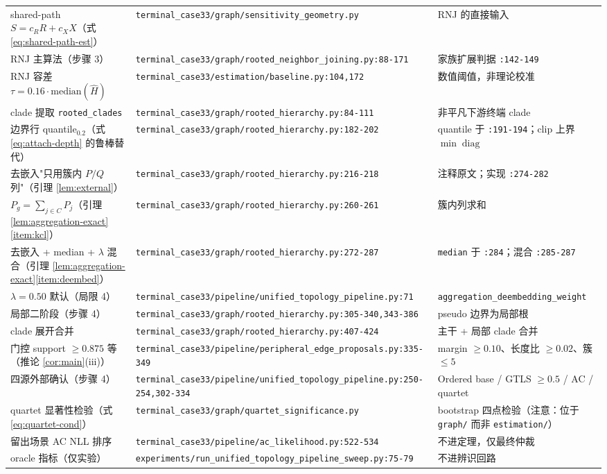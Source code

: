 \documentclass[UTF8,11pt]{ctexart}
\begin{document}
\begin{center}
\begin{tabular}{p{4.6cm}p{6.2cm}p{4.2cm}}
shared-path $S=c_RR+c_XX$（式 \eqref{eq:shared-path-est}）
  & \texttt{terminal\_case33/graph/sensitivity\_geometry.py}
  & RNJ 的直接输入 \\
RNJ 主算法（步骤 3）
  & \texttt{terminal\_case33/graph/rooted\_neighbor\_joining.py:88-171}
  & 家族扩展判据 \texttt{:142-149} \\
RNJ 容差 $\tau=0.16\cdot\mathrm{median}(\hat H)$
  & \texttt{terminal\_case33/estimation/baseline.py:104,172}
  & 数值阈值，非理论校准 \\
clade 提取 \texttt{rooted\_clades}
  & \texttt{terminal\_case33/graph/rooted\_hierarchy.py:84-111}
  & 非平凡下游终端 clade \\
边界行 quantile$_{0.2}$（式 \eqref{eq:attach-depth} 的鲁棒替代）
  & \texttt{terminal\_case33/graph/rooted\_hierarchy.py:182-202}
  & quantile 于 \texttt{:191-194}；clip 上界 $\min\operatorname{diag}$ \\
去嵌入"只用簇内 $P/Q$ 列"（引理 \ref{lem:external}）
  & \texttt{terminal\_case33/graph/rooted\_hierarchy.py:216-218}
  & 注释原文；实现 \texttt{:274-282} \\
$P_g=\sum_{j\in C}P_j$（引理 \ref{lem:aggregation-exact}\ref{item:kcl}）
  & \texttt{terminal\_case33/graph/rooted\_hierarchy.py:260-261}
  & 簇内列求和 \\
去嵌入 + median + $\lambda$ 混合（引理 \ref{lem:aggregation-exact}\ref{item:deembed}）
  & \texttt{terminal\_case33/graph/rooted\_hierarchy.py:272-287}
  & \texttt{median} 于 \texttt{:284}；混合 \texttt{:285-287} \\
$\lambda=0.50$ 默认（局限 4）
  & \texttt{terminal\_case33/pipeline/unified\_topology\_pipeline.py:71}
  & \texttt{aggregation\_deembedding\_weight} \\
局部二阶段（步骤 4）
  & \texttt{terminal\_case33/graph/rooted\_hierarchy.py:305-340,343-386}
  & pseudo 边界为局部根 \\
clade 展开合并
  & \texttt{terminal\_case33/graph/rooted\_hierarchy.py:407-424}
  & 主干 + 局部 clade 合并 \\
门控 support $\ge 0.875$ 等（推论 \ref{cor:main}(iii)）
  & \texttt{terminal\_case33/pipeline/peripheral\_edge\_proposals.py:335-349}
  & margin $\ge 0.10$、长度比 $\ge 0.02$、簇 $\le 5$ \\
四源外部确认（步骤 4）
  & \texttt{terminal\_case33/pipeline/unified\_topology\_pipeline.py:250-254,302-334}
  & Ordered base / GTLS $\ge0.5$ / AC / quartet \\
quartet 显著性检验（式 \eqref{eq:quartet-cond}）
  & \texttt{terminal\_case33/graph/quartet\_significance.py}
  & bootstrap 四点检验（注意：位于 \texttt{graph/} 而非 \texttt{estimation/}） \\
留出场景 AC NLL 排序
  & \texttt{terminal\_case33/pipeline/ac\_likelihood.py:522-534}
  & 不进定理，仅最终仲裁 \\
oracle 指标（仅实验）
  & \texttt{experiments/run\_unified\_topology\_pipeline\_sweep.py:75-79}
  & 不进辨识回路 \\
\bottomrule
\end{tabular}
\end{center}
\end{document}
